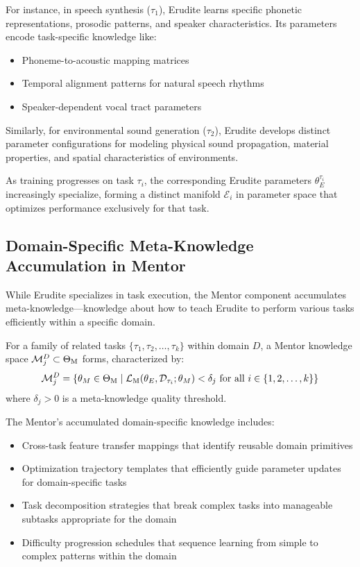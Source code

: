 For instance, in speech synthesis ($\tau_1$), Erudite learns specific phonetic representations, prosodic patterns, and speaker characteristics. Its parameters encode task-specific knowledge like:
\begin{itemize}
    \item Phoneme-to-acoustic mapping matrices
    \item Temporal alignment patterns for natural speech rhythms
    \item Speaker-dependent vocal tract parameters
\end{itemize}

Similarly, for environmental sound generation ($\tau_2$), Erudite develops distinct parameter configurations for modeling physical sound propagation, material properties, and spatial characteristics of environments.

\begin{proposition}
As training progresses on task $\tau_i$, the corresponding Erudite parameters $\theta_E^{\tau_i}$ increasingly specialize, forming a distinct manifold $\mathcal{E}_i$ in parameter space that optimizes performance exclusively for that task.
\end{proposition}

\subsection{Domain-Specific Meta-Knowledge Accumulation in Mentor}

While Erudite specializes in task execution, the Mentor component accumulates meta-knowledge—knowledge about how to teach Erudite to perform various tasks efficiently within a specific domain.

\begin{definition}
For a family of related tasks $\{\tau_1, \tau_2, \ldots, \tau_k\}$ within domain $D$, a Mentor knowledge space $\mathcal{M}_j^D \subset \Theta_{\text{M}}$ forms, characterized by:
\begin{equation}
\mathcal{M}_j^D = \{\theta_M \in \Theta_{\text{M}} \mid \mathcal{L}_{\text{M}}(\theta_E, \mathcal{D}_{\tau_i}; \theta_M) < \delta_j \text{ for all } i \in \{1,2,\ldots,k\}\}
\end{equation}
where $\delta_j > 0$ is a meta-knowledge quality threshold.
\end{definition}

The Mentor's accumulated domain-specific knowledge includes:
\begin{itemize}
    \item Cross-task feature transfer mappings that identify reusable domain primitives
    \item Optimization trajectory templates that efficiently guide parameter updates for domain-specific tasks
    \item Task decomposition strategies that break complex tasks into manageable subtasks appropriate for the domain
    \item Difficulty progression schedules that sequence learning from simple to complex patterns within the domain
\end{itemize}

